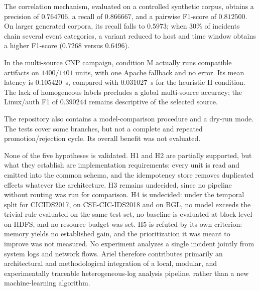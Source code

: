 The correlation mechanism, evaluated on a controlled synthetic corpus,
obtains a precision of $0.764706$, a recall of $0.866667$, and a pairwise
F1-score of $0.812500$. On larger generated corpora, its recall falls to
$0.5973$; when 30\% of incidents chain several event categories, a variant
reduced to host and time window obtains a higher F1-score ($0.7268$ versus
$0.6496$).

In the multi-source CNP campaign, condition M actually runs compatible
artifacts on $1400/1401$ units, with one Apache fallback and no error. Its
mean latency is $0.105420$~s, compared with $0.031027$~s for the heuristic H
condition. The lack of homogeneous labels precludes a global multi-source
accuracy; the Linux/auth F1 of $0.390244$ remains descriptive of the selected
source.

The repository also contains a model-comparison procedure and a dry-run mode.
The tests cover some branches, but not a complete and repeated
promotion/rejection cycle. Its overall benefit was not evaluated.

None of the five hypotheses is validated. H1 and H2 are partially supported,
but what they establish are implementation requirements: every unit is read
and emitted into the common schema, and the idempotency store removes
duplicated effects whatever the architecture. H3 remains undecided, since no
pipeline without routing was run for comparison. H4 is undecided: under the
temporal split for CICIDS2017, on CSE-CIC-IDS2018 and on BGL, no model
exceeds the trivial rule evaluated on the same test set, no baseline is
evaluated at block level on HDFS, and no resource budget was set. H5 is
refuted by its own criterion: memory yields no established gain, and the
prioritization it was meant to improve was not measured. No experiment
analyzes a single incident jointly from system logs and network flows. Ariel \logminer{}
therefore contributes primarily an architectural and methodological
integration of a local, modular, and experimentally traceable
heterogeneous-log analysis pipeline, rather than a new machine-learning
algorithm.
